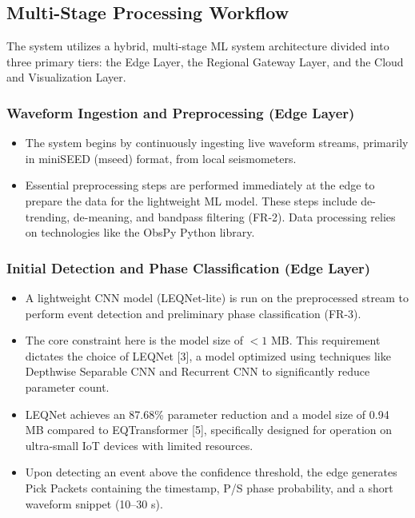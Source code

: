 \documentclass[a4paper,12pt]{report}
\begin{document}
\subsection{Multi-Stage Processing Workflow}
\label{ssec:workflow}

The system utilizes a hybrid, multi-stage ML system architecture divided into three primary tiers: the Edge Layer, the Regional Gateway Layer, and the Cloud and Visualization Layer.

\subsubsection{Waveform Ingestion and Preprocessing (Edge Layer)}
\begin{itemize}
\item The system begins by continuously ingesting live waveform streams, primarily in miniSEED (mseed) format, from local seismometers.
\item Essential preprocessing steps are performed immediately at the edge to prepare the data for the lightweight ML model. These steps include de-trending, de-meaning, and bandpass filtering (FR-2). Data processing relies on technologies like the ObsPy Python library.
\end{itemize}

\subsubsection{Initial Detection and Phase Classification (Edge Layer)}
\begin{itemize}
\item A lightweight CNN model (LEQNet-lite) is run on the preprocessed stream to perform event detection and preliminary phase classification (FR-3).
\item The core constraint here is the model size of $< 1$ MB. This requirement dictates the choice of LEQNet [3], a model optimized using techniques like Depthwise Separable CNN and Recurrent CNN to significantly reduce parameter count.
\item LEQNet achieves an 87.68\% parameter reduction and a model size of 0.94 MB compared to EQTransformer [5], specifically designed for operation on ultra-small IoT devices with limited resources.
\item Upon detecting an event above the confidence threshold, the edge generates Pick Packets containing the timestamp, P/S phase probability, and a short waveform snippet (10--30 s).
\end{itemize}
\end{document}
